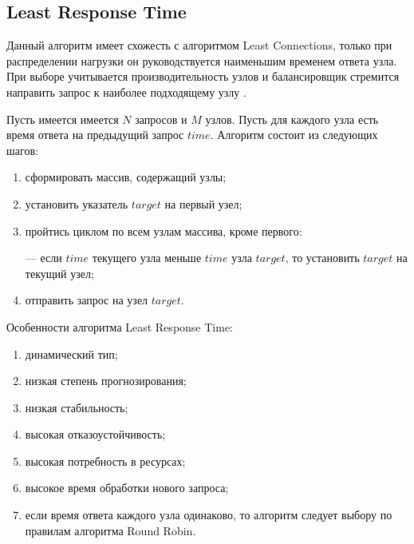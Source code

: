 
\subsection{Least Response Time}

Данный алгоритм имеет схожесть с алгоритмом Least Connections, только при распределении нагрузки он руководствуется наименьшим временем ответа узла.
При выборе учитывается производительность узлов и балансировщик стремится направить запрос к наиболее подходящему узлу \cite{leastresponsetime}.

Пусть имеется имеется $N$ запросов и $M$ узлов. Пусть для каждого узла есть время ответа на предыдущий запрос $time$.
Алгоритм состоит из следующих шагов:

\begin{enumerate}
	\item сформировать массив, содержащий узлы;
	\item установить указатель $target$ на первый узел;
	\item пройтись циклом по всем узлам массива, кроме первого:
	
	--- если $time$ текущего узла меньше $time$ узла $target$, то установить $target$ на текущий узел; 
 
	\item отправить запрос на узел $target$.
\end{enumerate}

Особенности алгоритма Least Response Time:
\begin{enumerate}[label=---]
	\item динамический тип;
	\item низкая степень прогнозирования; 
	\item низкая стабильность;
	\item высокая отказоустойчивость;
	\item высокая потребность в ресурсах;
	\item высокое время обработки нового запроса;
	\item если время ответа каждого узла одинаково, то алгоритм следует выбору по правилам алгоритма Round Robin.
	 
\end{enumerate}